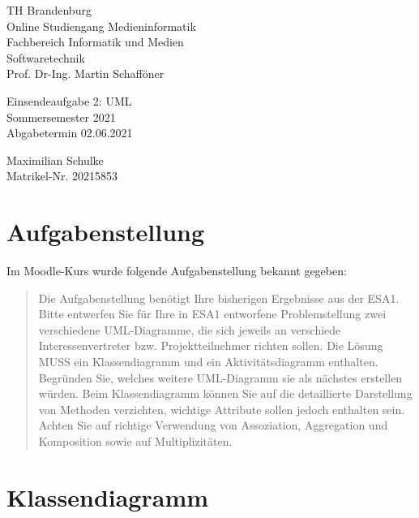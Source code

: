 \documentclass{article}
\begin{document}
\begin{titlepage}
	\begin{flushleft}
		TH Brandenburg \\
		Online Studiengang Medieninformatik \\
		Fachbereich Informatik und Medien \\
		Softwaretechnik \\
		Prof. Dr-Ing. Martin Schafföner
	\end{flushleft}

	\vfill

	\begin{center}
		\Large{Einsendeaufgabe 2: UML}\\[0.5em]
		\large{Sommersemester 2021}\\[0.25em]
		\large{Abgabetermin 02.06.2021}
	\end{center}

	\vfill

	\begin{flushright}
		Maximilian Schulke \\
		Matrikel-Nr. 20215853
	\end{flushright}
\end{titlepage}

\tableofcontents

\newpage

\section{Aufgabenstellung}

Im Moodle-Kurs wurde folgende Aufgabenstellung bekannt gegeben:

\begin{quote}
	Die Aufgabenstellung benötigt Ihre bisherigen Ergebnisse aus der ESA1.
	Bitte entwerfen Sie für Ihre in ESA1 entworfene Problemstellung zwei
	verschiedene UML-Diagramme, die sich jeweils an verschiede
	Interessenvertreter bzw. Projektteilnehmer richten sollen. Die Lösung MUSS
	ein Klassendiagramm und ein Aktivitätsdiagramm enthalten. Begründen Sie,
	welches weitere UML-Diagramm sie als nächstes erstellen würden. Beim
	Klassendiagramm können Sie auf die detaillierte Darstellung von Methoden
	verzichten, wichtige Attribute sollen jedoch enthalten sein. Achten Sie auf
	richtige Verwendung von Assoziation, Aggregation und Komposition sowie auf
	Multiplizitäten.
\end{quote}

\newpage

\section{Klassendiagramm}
\end{document}
